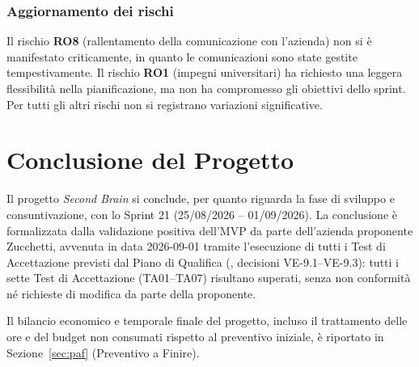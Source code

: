 \subsubsection{Aggiornamento dei rischi}
Il rischio \textbf{RO8} (rallentamento della comunicazione con l'azienda) non si è manifestato criticamente, in quanto le comunicazioni sono state gestite tempestivamente. Il rischio \textbf{RO1} (impegni universitari) ha richiesto una leggera flessibilità nella pianificazione, ma non ha compromesso gli obiettivi dello sprint. Per tutti gli altri rischi non si registrano variazioni significative.


\section{Conclusione del Progetto}
\label{sec:conclusione}

Il progetto \textit{Second Brain} si conclude, per quanto riguarda la fase di
sviluppo e consuntivazione, con lo Sprint 21 (25/08/2026 -- 01/09/2026). La
conclusione è formalizzata dalla validazione positiva dell'MVP da parte
dell'azienda proponente Zucchetti, avvenuta in data 2026-09-01 tramite
l'esecuzione di tutti i Test di Accettazione previsti dal Piano di Qualifica
(, decisioni VE-9.1--VE-9.3): tutti i sette Test di
Accettazione (TA01--TA07) risultano superati, senza non conformità né
richieste di modifica da parte della proponente.

Il bilancio economico e temporale finale del progetto, incluso il
trattamento delle ore e del budget non consumati rispetto al preventivo
iniziale, è riportato in Sezione~\ref{sec:paf} (Preventivo a Finire).
